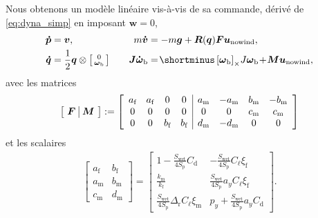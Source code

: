         Nous obtenons un modèle linéaire vis-à-vis de sa commande, dérivé de \eqref{eq:dyna_simp} en imposant  $\boldsymbol{w} = 0$,
        \begin{subequations}\label{eq:withouwind}
        \begin{align}
                \boldsymbol{\dot p} &=  \boldsymbol{v}, \quad &
                m\boldsymbol{\dot v} &= - m\boldsymbol{g} +  \boldsymbol{R}(\boldsymbol{q})\boldsymbol{F}\boldsymbol{u}_{\text{nowind}},\\
                \boldsymbol{\dot q} &= \frac{1}{2}\boldsymbol{q} \otimes \smallmat{0 \\ \boldsymbol{\omega}_{\text{b}}} \quad & \boldsymbol{J} \boldsymbol{\dot \omega}_{\text{b}} &= \! \shortminus \skewsym{\boldsymbol{\omega}_{\text{b}}}\!J\boldsymbol{\omega}_{\text{b}} \! + \! \boldsymbol{M}\boldsymbol{u}_{\text{nowind}},
        \end{align}
        \end{subequations}
        avec les matrices
        \begin{align*}
            \left[ \begin{array}{c|c}\!\boldsymbol{F}\!&\!\boldsymbol{M}\!\end{array} \right] := \left[ \begin{array}{cccc | cccc} a_{\text{f}} & a_{\text{f}} & 0 & 0 & a_{\text{m}} & -a_{\text{m}} & b_{\text{m}} & -b_{\text{m}} \\  0 & 0 & 0 & 0 & 0 & 0 & c_{\text{m}} & c_{\text{m}} \\ 0 & 0 & b_{\text{f}} & b_{\text{f}} & d_{\text{m}} & -d_{\text{m}} & 0 & 0 \end{array} \right]
        \end{align*}
        et les scalaires
            \begin{align*}
                \left[\!\! \begin{array}{c|c} 
                a_{\text{f}} & b_{\text{f}} \\ \hline
                a_{\text{m}} & b_{\text{m}} \\ \hline
                c_{\text{m}} & d_{\text{m}}
                \end{array} \!\!\right] \!=\!
                \left[\begin{array}{c|c}
                1-\frac{S_{\text{wet}}}{4S_{\text{p}}} C_{\text{d}}  & -\frac{S_{\text{wet}}}{4S_{\text{p}}}C_{\ell}\xi_{\text{f}} \\ \hline
                \frac{k_{\text{m}} }{k_{\text{f}}}  &   \! \frac{S_{\text{wet}}}{4S_{\text{p}}}a_{y}C_{\ell}\xi_{\text{f}} \!\\ \hline
                \!\! \frac{S_{\text{wet}}}{4S_{\text{p}}} \Delta_{\text{r}}C_{\ell}\xi_{\text{m}} \!\! & 
                p_{y}+\frac{S_{\text{wet}}}{4S_{\text{p}}} a_{y} C_{\text{d}}
                \end{array}\right].
            \end{align*}


